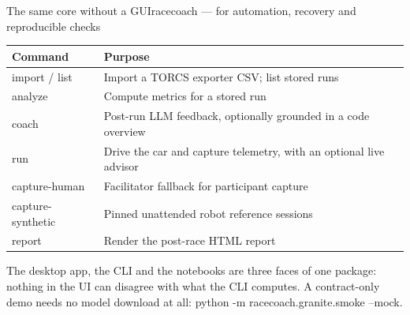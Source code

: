 \documentclass[aspectratio=169,10pt]{beamer}
\newcommand{\code}[1]{{\ttfamily\small #1}}
\begin{document}
\begin{frame}{The same core without a GUI}{\code{racecoach} --- for automation, recovery and reproducible checks}
  \small
  \begin{tabular}{@{}L{40mm}L{88mm}@{}}
    \toprule
    \textbf{Command} & \textbf{Purpose} \\
    \midrule
    \code{import} / \code{list} & Import a TORCS exporter CSV; list stored runs \\
    \code{analyze} & Compute metrics for a stored run \\
    \code{coach} & Post-run LLM feedback, optionally grounded in a code overview \\
    \code{run} & Drive the car and capture telemetry, with an optional live advisor \\
    \code{capture-human} & Facilitator fallback for participant capture \\
    \code{capture-synthetic} & Pinned unattended robot reference sessions \\
    \code{report} & Render the post-race HTML report \\
    \bottomrule
  \end{tabular}
  \par\vspace{0.8em}
  {\footnotesize\color{cgray}The desktop app, the CLI and the notebooks are three faces
  of one package: nothing in the UI can disagree with what the CLI computes.
  A contract-only demo needs no model download at all:
  \code{python -m racecoach.granite.smoke --mock}.}
\end{frame}
\end{document}

